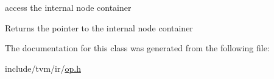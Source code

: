 access the internal node container 

\begin{DoxyReturn}{Returns}
the pointer to the internal node container 
\end{DoxyReturn}


The documentation for this class was generated from the following file\+:\begin{DoxyCompactItemize}
\item 
include/tvm/ir/\hyperlink{ir_2op_8h}{op.\+h}\end{DoxyCompactItemize}
